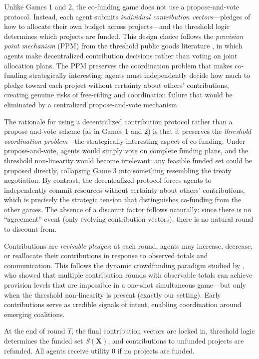 Unlike Games 1 and 2, the co-funding game does not use a propose-and-vote protocol.
Instead, each agent submits \emph{individual contribution vectors}---pledges of how to allocate their own budget across projects---and the threshold logic determines which projects are funded.
This design choice follows the \emph{provision point mechanism} (PPM) from the threshold public goods literature \citep{bagnoli1989provision}, in which agents make decentralized contribution decisions rather than voting on joint allocation plans.
The PPM preserves the coordination problem that makes co-funding strategically interesting: agents must independently decide how much to pledge toward each project without certainty about others' contributions, creating genuine risks of free-riding and coordination failure that would be eliminated by a centralized propose-and-vote mechanism.

The rationale for using a decentralized contribution protocol rather than a propose-and-vote scheme (as in Games 1 and 2) is that it preserves the \emph{threshold coordination problem}---the strategically interesting aspect of co-funding.
Under propose-and-vote, agents would simply vote on complete funding plans, and the threshold non-linearity would become irrelevant: any feasible funded set could be proposed directly, collapsing Game 3 into something resembling the treaty negotiation.
By contrast, the decentralized protocol forces agents to independently commit resources without certainty about others' contributions, which is precisely the strategic tension that distinguishes co-funding from the other games.
The absence of a discount factor follows naturally: since there is no ``agreement'' event (only evolving contribution vectors), there is no natural round to discount from.

Contributions are \emph{revisable pledges}: at each round, agents may increase, decrease, or reallocate their contributions in response to observed totals and communication.
This follows the dynamic crowdfunding paradigm studied by \citet{marx2000dynamic}, who showed that multiple contribution rounds with observable totals can achieve provision levels that are impossible in a one-shot simultaneous game---but only when the threshold non-linearity is present (exactly our setting).
Early contributions serve as credible signals of intent, enabling coordination around emerging coalitions.

At the end of round $T$, the final contribution vectors are locked in, threshold logic determines the funded set $S(\bm{X})$, and contributions to unfunded projects are refunded.
All agents receive utility 0 if no projects are funded.

